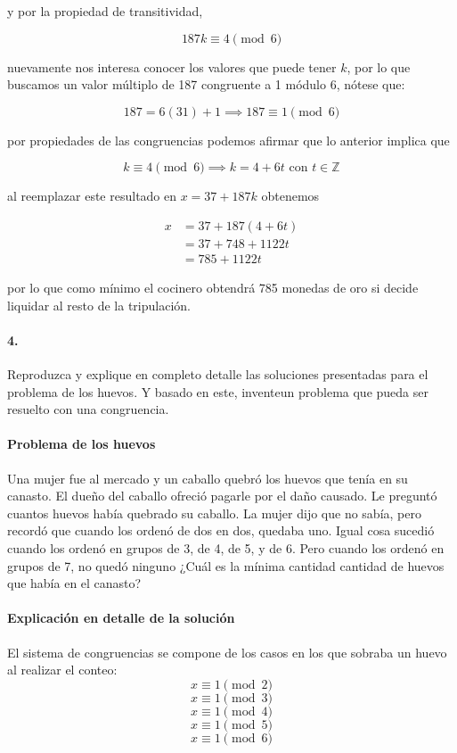 \documentclass{article}
\begin{document}
	y por la propiedad de transitividad,
	
	$$187k \equiv 4 \pmod{6}$$
	
	nuevamente nos interesa conocer los valores que puede tener $k$, por lo que buscamos un valor múltiplo de 187 congruente a 1 módulo 6, nótese que:
	
	$$187 = 6(31) + 1 \implies 187 \equiv 1 \pmod{6}$$
	
	por propiedades de las congruencias podemos afirmar que lo anterior implica que
	
	$$k \equiv 4 \pmod{6} \implies k = 4 + 6t \text{ con } t \in \mathbb{Z}$$
	
	al reemplazar este resultado en $x = 37 + 187k$ obtenemos
	
	\begin{align*}
	x &= 37 + 187(4 + 6t)\\
	&= 37 + 748 + 1122t\\
	&= 785 + 1122t
	\end{align*}
	
	por lo que como mínimo el cocinero obtendrá 785 monedas de oro si decide liquidar al resto de la tripulación.
	
	\paragraph{4.} Reproduzca y explique en completo detalle las soluciones presentadas para el problema de los huevos. Y basado en este, inventeun problema que pueda ser resuelto con una congruencia.
	
	\paragraph{Problema de los huevos} Una mujer fue al mercado y un caballo quebró los huevos que tenía en su canasto. El dueño del caballo ofreció pagarle por el daño causado. Le preguntó cuantos huevos había quebrado su caballo. La mujer dijo que no sabía, pero recordó que cuando los ordenó de dos en dos, quedaba uno. Igual cosa sucedió cuando los ordenó en grupos de 3, de 4, de 5, y de 6. Pero cuando los ordenó en grupos de 7, no quedó ninguno ¿Cuál es la mínima cantidad cantidad de huevos que había en el canasto?
	
	\paragraph{Explicación en detalle de la solución} El sistema de congruencias se compone de los  casos en los que sobraba un huevo al realizar el conteo:
	$$x \equiv 1 \pmod{2}$$
	$$x \equiv 1 \pmod{3}$$
	$$x \equiv 1 \pmod{4}$$
	$$x \equiv 1 \pmod{5}$$
	$$x \equiv 1 \pmod{6}$$
	
\end{document}
